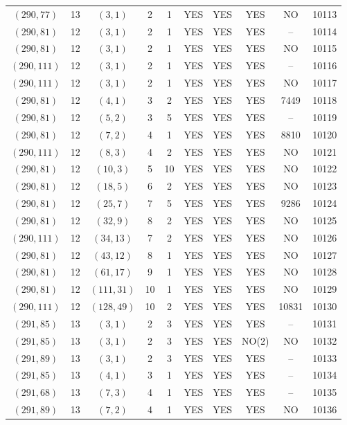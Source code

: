 \begin{longtable}{|c|c|c|c|c|c|c|c|c|c|}
$(290, 77)$ & 13 & $(3, 1)$ & 2 & 1 & YES & YES & YES & NO & 10113\\
$(290, 81)$ & 12 & $(3, 1)$ & 2 & 1 & YES & YES & YES & -- & 10114\\
$(290, 81)$ & 12 & $(3, 1)$ & 2 & 1 & YES & YES & YES & NO & 10115\\
$(290, 111)$ & 12 & $(3, 1)$ & 2 & 1 & YES & YES & YES & -- & 10116\\
$(290, 111)$ & 12 & $(3, 1)$ & 2 & 1 & YES & YES & YES & NO & 10117\\
$(290, 81)$ & 12 & $(4, 1)$ & 3 & 2 & YES & YES & YES & 7449 & 10118\\
$(290, 81)$ & 12 & $(5, 2)$ & 3 & 5 & YES & YES & YES & -- & 10119\\
$(290, 81)$ & 12 & $(7, 2)$ & 4 & 1 & YES & YES & YES & 8810 & 10120\\
$(290, 111)$ & 12 & $(8, 3)$ & 4 & 2 & YES & YES & YES & NO & 10121\\
$(290, 81)$ & 12 & $(10, 3)$ & 5 & 10 & YES & YES & YES & NO & 10122\\
$(290, 81)$ & 12 & $(18, 5)$ & 6 & 2 & YES & YES & YES & NO & 10123\\
$(290, 81)$ & 12 & $(25, 7)$ & 7 & 5 & YES & YES & YES & 9286 & 10124\\
$(290, 81)$ & 12 & $(32, 9)$ & 8 & 2 & YES & YES & YES & NO & 10125\\
$(290, 111)$ & 12 & $(34, 13)$ & 7 & 2 & YES & YES & YES & NO & 10126\\
$(290, 81)$ & 12 & $(43, 12)$ & 8 & 1 & YES & YES & YES & NO & 10127\\
$(290, 81)$ & 12 & $(61, 17)$ & 9 & 1 & YES & YES & YES & NO & 10128\\
$(290, 81)$ & 12 & $(111, 31)$ & 10 & 1 & YES & YES & YES & NO & 10129\\
$(290, 111)$ & 12 & $(128, 49)$ & 10 & 2 & YES & YES & YES & 10831 & 10130\\
$(291, 85)$ & 13 & $(3, 1)$ & 2 & 3 & YES & YES & YES & -- & 10131\\
$(291, 85)$ & 13 & $(3, 1)$ & 2 & 3 & YES & YES & NO(2) & NO & 10132\\
$(291, 89)$ & 13 & $(3, 1)$ & 2 & 3 & YES & YES & YES & -- & 10133\\
$(291, 85)$ & 13 & $(4, 1)$ & 3 & 1 & YES & YES & YES & -- & 10134\\
$(291, 68)$ & 13 & $(7, 3)$ & 4 & 1 & YES & YES & YES & -- & 10135\\
$(291, 89)$ & 13 & $(7, 2)$ & 4 & 1 & YES & YES & YES & NO & 10136\\

\end{longtable}
